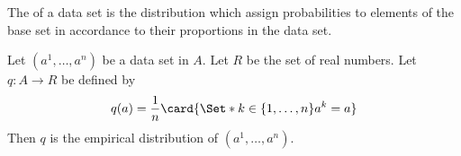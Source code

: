 


The 
of a data set is the distribution
which assign probabilities to
elements of the base set in accordance
to their proportions in the
data set.


Let $(a^1, \dots, a^n)$ be a data set in $A$.
Let $R$ be the set of real numbers.
Let $q: A \to R$ be defined by
\[
  q(a) = \frac{1}{n} \card{\Set*{k \in \set{1, \dots, n}}{a^k = a}}
\]
Then $q$ is the empirical distribution
of $(a^1, \dots, a^n)$.

